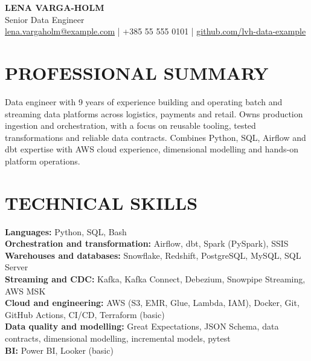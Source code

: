 \documentclass[11pt,a4paper]{article}
\newcommand{\cvsection}[1]{\section*{#1}}
\begin{document}
{\Huge\bfseries\color{primarycolor} LENA VARGA-HOLM}\\[0.35em]
{\large\color{accentcolor} Senior Data Engineer}\\[0.35em]
{\small\href{mailto:lena.vargaholm@example.com}{lena.vargaholm@example.com} | +385 55 555 0101 | \href{https://github.com/lvh-data-example}{github.com/lvh-data-example}}

\cvsection{PROFESSIONAL SUMMARY}
Data engineer with 9 years of experience building and operating batch and streaming data platforms across logistics, payments and retail. Owns production ingestion and orchestration, with a focus on reusable tooling, tested transformations and reliable data contracts. Combines Python, SQL, Airflow and dbt expertise with AWS cloud experience, dimensional modelling and hands-on platform operations.

\cvsection{TECHNICAL SKILLS}
\textbf{Languages:} Python, SQL, Bash\\
\textbf{Orchestration and transformation:} Airflow, dbt, Spark (PySpark), SSIS\\
\textbf{Warehouses and databases:} Snowflake, Redshift, PostgreSQL, MySQL, SQL Server\\
\textbf{Streaming and CDC:} Kafka, Kafka Connect, Debezium, Snowpipe Streaming, AWS MSK\\
\textbf{Cloud and engineering:} AWS (S3, EMR, Glue, Lambda, IAM), Docker, Git, GitHub Actions, CI/CD, Terraform (basic)\\
\textbf{Data quality and modelling:} Great Expectations, JSON Schema, data contracts, dimensional modelling, incremental models, pytest\\
\textbf{BI:} Power BI, Looker (basic)
\end{document}
